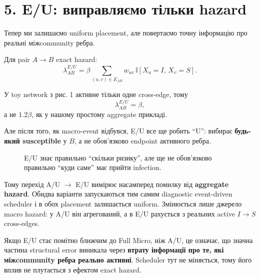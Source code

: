 \documentclass[11pt,a4paper]{article}
\newcommand{\I}{\mathbb{I}}
\begin{document}
\section*{5. E/U: виправляємо тільки hazard}

Тепер ми залишаємо uniform placement, але повертаємо точну інформацію про реальні міжcommunity ребра.

Для pair $A\to B$ exact hazard:
\[
 \lambda^{E/U}_{AB}
 =\beta\sum_{(u,v)\in E_{AB}} w_{uv}\,\I[X_u=I,\,X_v=S].
\]

У toy network з рис. 1 активне тільки одне cross-edge, тому
\[
 \lambda^{E/U}_{AB}=\beta,
\]
а не $1.2\beta$, як у нашому простому aggregate прикладі.

Але після того, як macro-event відбувся, E/U все ще робить ``U'': вибирає \textbf{будь-який susceptible} у $B$, а не обов'язково endpoint активного ребра.

\begin{figure}[h!]
\centering
{}
\caption{E/U знає правильно ``скільки ризику'', але ще не обов'язково правильно ``куди саме'' має прийти infection.}
\end{figure}

Тому перехід A/U $\to$ E/U вимірює насамперед помилку від \textbf{aggregate hazard}. Обидва варіанти запускаються тим самим diagnostic event-driven scheduler і в обох placement залишається uniform. Змінюється лише джерело macro hazard: у A/U він агрегований, а в E/U рахується з реальних active $I\to S$ cross-edges.

\begin{tcolorbox}[colback=white,colframe=purple,title=Що саме перевіряє E/U?]
Якщо E/U стає помітно ближчим до Full Micro, ніж A/U, це означає, що значна частина structural error виникала через \textbf{втрату інформації про те, які міжcommunity ребра реально активні}. Scheduler тут не міняється, тому його вплив не плутається з ефектом exact hazard.
\end{tcolorbox}
\end{document}

